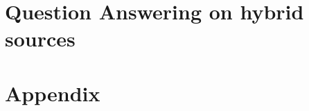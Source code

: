 

%







\part{Question Answering on hybrid sources}
{}








\appendix
\part{Appendix}
%
\cleardoublepage
\cleardoublepage

